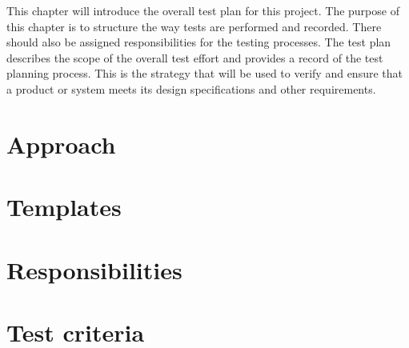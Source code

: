 This chapter will introduce the overall test plan for this project. 
The purpose of this chapter is to structure the way tests are performed and recorded. There should also be assigned responsibilities for the testing processes. 
The test plan describes the scope of the overall test effort and provides a record of the test planning process. 
This is the strategy that will be used to verify and ensure that a product or system meets its design specifications and other requirements. 

\section{Approach}
\section{Templates}
\section{Responsibilities}

\section{Test criteria} 

